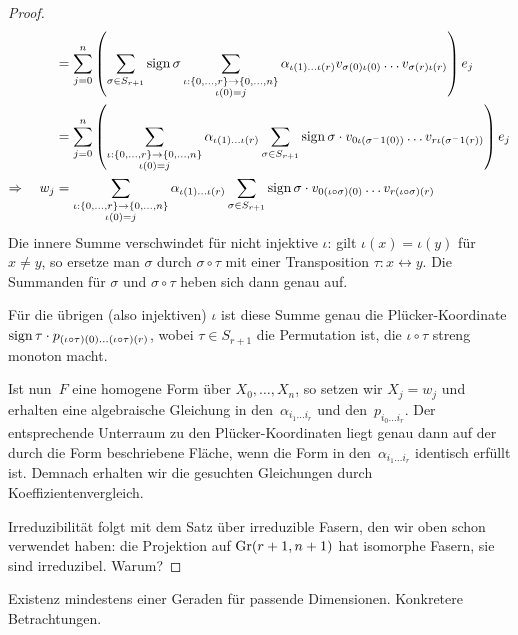 \begin{proof}
\begin{align*}
	&= \sum_{j=0}^n \left(\sum\limits_{\sigma \in S_{r+1}} \operatorname{sign} \sigma \sum_{\substack{\iota: \{0, \dots, r\} \rightarrow \{0, \dots, n\} \\ \iota(0)=j }} \alpha_{\iota(1) \dots \iota(r)} v_{\sigma(0)\iota(0)} \dots v_{\sigma(r)\iota(r)}\right) e_j \\
	&= \sum_{j=0}^n \left(\sum_{\substack{\iota: \{0, \dots, r\} \rightarrow \{0, \dots, n\} \\ \iota(0)=j }} \alpha_{\iota(1) \dots \iota(r)} \sum\limits_{\sigma \in S_{r+1}} \operatorname{sign} \sigma \cdot v_{0\iota(\sigma^-1(0))} \dots v_{r\iota(\sigma^-1(r))}\right) e_j \\
\Rightarrow\quad w_j	&= \sum_{\substack{\iota: \{0, \dots, r\} \rightarrow \{0, \dots, n\} \\ \iota(0)=j }} \alpha_{\iota(1) \dots \iota(r)} \sum\limits_{\sigma \in S_{r+1}} \operatorname{sign} \sigma \cdot v_{0(\iota\circ\sigma)(0)} \dots v_{r(\iota\circ\sigma)(r)}
\end{align*}
Die innere Summe verschwindet für nicht injektive $\iota$: gilt $\iota(x) = \iota(y)$ für $x \neq y$, so ersetze man $\sigma$ durch $\sigma \circ \tau$ mit einer Transposition $\tau: x \leftrightarrow y$. Die Summanden für $\sigma$ und $\sigma \circ \tau$ heben sich dann genau auf.

Für die übrigen (also injektiven) $\iota$ ist diese Summe genau die Plücker-Koordinate $\operatorname{sign} \tau \cdot p_{(\iota\circ\tau)(0)\dots(\iota\circ\tau)(r)}$, wobei $\tau \in S_{r+1}$ die Permutation ist, die $\iota \circ \tau$ streng monoton macht.

Ist nun~$F$ eine homogene Form über $X_0, \dots, X_n$, so setzen wir $X_j = w_j$ und erhalten eine algebraische Gleichung in den~$\alpha_{i_1 \dots i_r}$ und den~$p_{i_0 \dots i_r}$. Der entsprechende Unterraum zu den Plücker-Koordinaten liegt genau dann auf der durch die Form beschriebene Fläche, wenn die Form in den~$\alpha_{i_1 \dots i_r}$ identisch erfüllt ist. Demnach erhalten wir die gesuchten Gleichungen durch Koeffizientenvergleich.

Irreduzibilität folgt mit dem Satz über irreduzible Fasern, den wir oben schon verwendet haben: die Projektion auf $\grass r+1/{n+1}$ hat isomorphe Fasern, sie sind irreduzibel. \note Warum?
\end{proof}

\todo Existenz mindestens einer Geraden für passende Dimensionen.
\todo Konkretere Betrachtungen.
